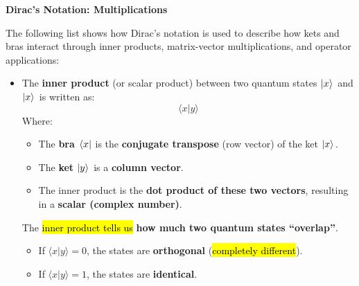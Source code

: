 \begin{flushleft}
    \textcolor{Green3}{ \textbf{Dirac's Notation: Multiplications}}
\end{flushleft}
The following list shows how Dirac's notation is used to describe how kets and bras interact through inner products, matrix-vector multiplications, and operator applications:
\begin{itemize}
    \item {}

    The \textbf{inner product} (or scalar product) between two quantum states $\left| x \rangle\right.$ and $\left| x \rangle\right.$ is written as:
    \begin{equation*}
        \langle x | y \rangle
    \end{equation*}
    Where:
    \begin{itemize}
        \item The \textbf{bra} $\left.\langle x \right|$ is the \textbf{conjugate transpose} (row vector) of the ket $\left| x \rangle\right.$.
        \item The \textbf{ket} $\left| y \rangle\right.$ is a \textbf{column vector}.
        \item The inner product is the \textbf{dot product of these two vectors}, resulting in a \textbf{scalar (complex number)}.
    \end{itemize}

    The \hl{inner product tells us} \textbf{how much two quantum states ``overlap''}.
    \begin{itemize}
        \item If $\langle x | y \rangle = 0$, the states are \textbf{orthogonal} (\hl{completely different}).
        \item If $\langle x | y \rangle = 1$, the states are \textbf{identical}.
    \end{itemize}


\end{itemize}

